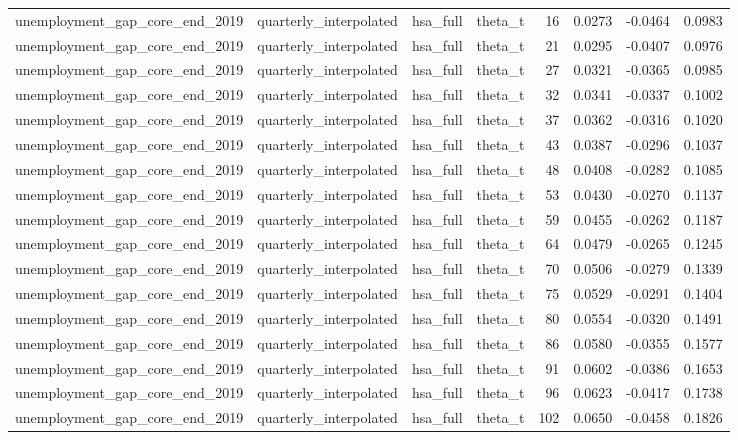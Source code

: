 \begin{tabular}{llllrrrr}
unemployment\_gap\_core\_end\_2019 & quarterly\_interpolated & hsa\_full & theta\_t & 16 & 0.0273 & -0.0464 & 0.0983 \\
unemployment\_gap\_core\_end\_2019 & quarterly\_interpolated & hsa\_full & theta\_t & 21 & 0.0295 & -0.0407 & 0.0976 \\
unemployment\_gap\_core\_end\_2019 & quarterly\_interpolated & hsa\_full & theta\_t & 27 & 0.0321 & -0.0365 & 0.0985 \\
unemployment\_gap\_core\_end\_2019 & quarterly\_interpolated & hsa\_full & theta\_t & 32 & 0.0341 & -0.0337 & 0.1002 \\
unemployment\_gap\_core\_end\_2019 & quarterly\_interpolated & hsa\_full & theta\_t & 37 & 0.0362 & -0.0316 & 0.1020 \\
unemployment\_gap\_core\_end\_2019 & quarterly\_interpolated & hsa\_full & theta\_t & 43 & 0.0387 & -0.0296 & 0.1037 \\
unemployment\_gap\_core\_end\_2019 & quarterly\_interpolated & hsa\_full & theta\_t & 48 & 0.0408 & -0.0282 & 0.1085 \\
unemployment\_gap\_core\_end\_2019 & quarterly\_interpolated & hsa\_full & theta\_t & 53 & 0.0430 & -0.0270 & 0.1137 \\
unemployment\_gap\_core\_end\_2019 & quarterly\_interpolated & hsa\_full & theta\_t & 59 & 0.0455 & -0.0262 & 0.1187 \\
unemployment\_gap\_core\_end\_2019 & quarterly\_interpolated & hsa\_full & theta\_t & 64 & 0.0479 & -0.0265 & 0.1245 \\
unemployment\_gap\_core\_end\_2019 & quarterly\_interpolated & hsa\_full & theta\_t & 70 & 0.0506 & -0.0279 & 0.1339 \\
unemployment\_gap\_core\_end\_2019 & quarterly\_interpolated & hsa\_full & theta\_t & 75 & 0.0529 & -0.0291 & 0.1404 \\
unemployment\_gap\_core\_end\_2019 & quarterly\_interpolated & hsa\_full & theta\_t & 80 & 0.0554 & -0.0320 & 0.1491 \\
unemployment\_gap\_core\_end\_2019 & quarterly\_interpolated & hsa\_full & theta\_t & 86 & 0.0580 & -0.0355 & 0.1577 \\
unemployment\_gap\_core\_end\_2019 & quarterly\_interpolated & hsa\_full & theta\_t & 91 & 0.0602 & -0.0386 & 0.1653 \\
unemployment\_gap\_core\_end\_2019 & quarterly\_interpolated & hsa\_full & theta\_t & 96 & 0.0623 & -0.0417 & 0.1738 \\
unemployment\_gap\_core\_end\_2019 & quarterly\_interpolated & hsa\_full & theta\_t & 102 & 0.0650 & -0.0458 & 0.1826 \\

\end{tabular}
